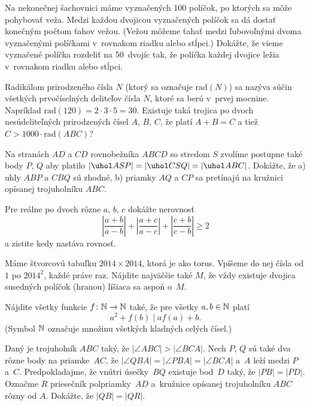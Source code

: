 {%
Na nekonečnej šachovnici máme vyznačených 100 políčok, po ktorých sa môže pohybovať veža. Medzi každou dvojicou vyznačených políčok sa dá dostať konečným počtom ťahov vežou. (Vežou môžeme ťahať medzi ľubovoľnými dvoma vyznačenými políčkami v~rovnakom riadku alebo stĺpci.) Dokážte, že vieme vyznačené políčka rozdeliť na 50~dvojíc tak, že políčka každej dvojice ležia v~rovnakom riadku alebo stĺpci.
}

{%
Radikálom prirodzeného čísla $N$ (ktorý sa označuje $\text{rad}(N)$) sa nazýva súčin všetkých prvočíselných deliteľov čísla $N$, ktoré sa berú v~prvej mocnine. Napríklad $\text{rad}(120) = 2 \cdot 3 \cdot 5 = 30$. Existuje taká trojica po dvoch nesúdeliteľných prirodzených čísel $A$, $B$, $C$, že platí $A + B = C$ a tiež $C > 1000 \cdot\text{rad}(ABC)$? }

{%
Na stranách $AD$ a $CD$ rovnobežníka $ABCD$ so stredom $S$ zvolíme postupne také body $P$, $Q$ aby platilo $|\uhol ASP| = |\uhol CSQ| = |\uhol ABC|$. Dokážte, že
\ite a) uhly $ABP$ a $CBQ$ sú zhodné,
\ite b) priamky $AQ$ a $CP$ sa pretínajú na kružnici opísanej trojuholníku
$ABC$.}

{%
Pre reálne po dvoch rôzne $a$, $b$, $c$ dokážte nerovnosť
$$\left|\frac{a+b}{a-b}\right|+\left| \frac{a+c}{a-c} \right| + \left| \frac{c+b}{c-b} \right| \ge 2$$
a zistite kedy nastáva rovnosť.}

{%
Máme štvorcovú tabuľku $2014 \times 2014$, ktorá je ako torus. Vpíšeme do nej čísla od $1$ po $2014^{2}$, každé práve raz. Nájdite najväčšie také $M$, že vždy existuje dvojica susedných políčok (hranou) líšiaca sa aspoň o~$M$.}

{%
Nájdite všetky funkcie $f\colon\Bbb N\to\Bbb N$ také, že pre všetky $a,b\in \Bbb N$ platí
$$
a^2+f(b)\mid af(a)+b.
$$
(Symbol $\Bbb N$ označuje množinu všetkých kladných celých čísel.)}

{%
Daný je trojuholník $ABC$ taký, že $|\angle ABC|>|\angle BCA|$. Nech $P$, $Q$ sú také dva rôzne body na priamke~$AC$, že $|\angle QBA|=|\angle PBA|=|\angle BCA|$ a~$A$ leží medzi $P$ a~$C$. Predpokladajme, že vnútri úsečky~$BQ$ existuje bod~$D$ taký, že $|PB|=|PD|$. Označme $R$ priesečník polpriamky~$AD$ a~kružnice opísanej trojuholníku $ABC$ rôzny od $A$. Dokážte, že $|QB|=|QR|$.}


